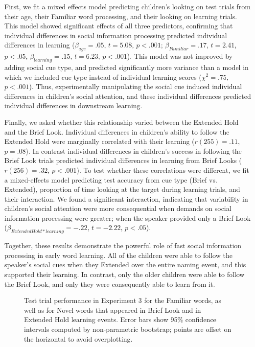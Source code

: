 \documentclass{pnastwo}
\begin{document}
\begin{article}
First, we fit a mixed effects model predicting children's looking on test trials from their age, their Familiar word processing, and their looking on learning trials. This model showed significant effects of all three predictors, confirming that individual differences in social information processing predicted individual differences in learning ($\beta_{age} = .05$, $t = 5.08$, $p < .001$; $\beta_{Familiar} = .17$, $t = 2.41$, $p < .05$, $\beta_{learning} = .15$, $t = 6.23$, $p < .001$). This model was not improved by adding social cue type, and predicted significantly more variance than a model in which we included cue type instead of individual learning scores ($\chi^{2} = .75$, $p < .001$). Thus, experimentally manipulating the social cue induced individual differences in children's social attention, and these individual differences predicted individual differences in downstream learning.

Finally, we asked whether this relationship varied between the Extended Hold and the Brief Look. Individual differences in children's ability to follow the Extended Hold were marginally correlated with their learning ($r(255) = .11$, $p = .08$). In contrast individual differences in children's success in following the Brief Look trials predicted individual differences in learning from Brief Looks ($r(256) = .32$, $p <.001$). To test whether these correlations were different, we fit a mixed-effects model predicting test accuracy from cue type (Brief vs. Extended), proportion of time looking at the target during learning trials, and their interaction. We found a significant interaction, indicating that variability in children's social attention were more consequential when demands on social information processing were greater; when the speaker provided only a Brief Look ($\beta_{Extended Hold * learning} = -.22$, $t = -2.22$, $p < .05$).

Together, these results demonstrate the powerful role of fast social information processing in early word learning. All of the children were able to follow the speaker's social cues when they Extended over the entire naming event, and this supported their learning. In contrast, only the older children were able to follow the Brief Look, and only they were consequently able to learn from it.


\begin{figure}[tb]
	\caption{\label{fig:soc_word_test}Test trial performance in Experiment 3 for the Familiar words, as well as for Novel words that appeared in Brief Look and in Extended Hold learning events. Error bars show 95\% confidence intervals computed by non-parametric bootstrap; points are offset on the horizontal to avoid overplotting.}
\end{figure}



\end{article}
\end{document}
